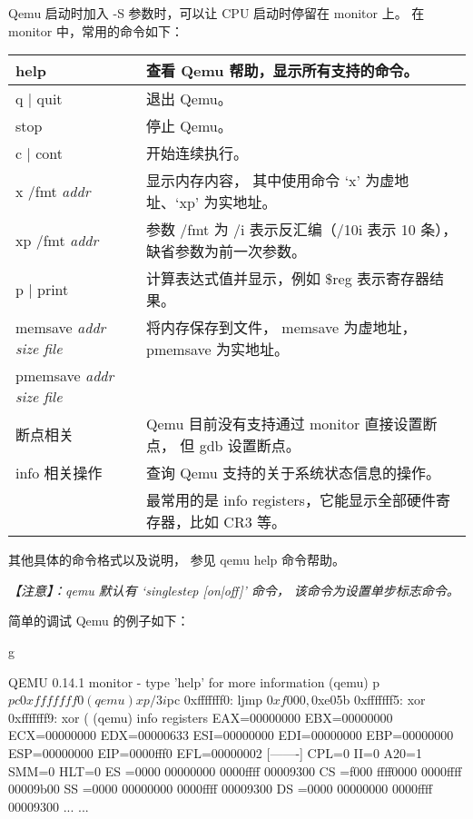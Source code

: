 Qemu 启动时加入 -S 参数时，可以让 CPU 启动时停留在 monitor 上。
在 monitor 中，常用的命令如下：
\begin{small}
\begin{longtable}[htbp]
{|>{\raggedright}p{}@{\hspace{1em}}|>{\raggedright}p{}|}
\hline
help & 查看 Qemu 帮助，显示所有支持的命令。\tabularnewline\hline
q | quit & 退出 Qemu。\tabularnewline\hline
stop & 停止 Qemu。\tabularnewline\hline
c | cont & 开始连续执行。\tabularnewline\hline
x /fmt {\it{addr}} & 显示内存内容，
    其中使用命令 `x' 为虚地址、`xp' 为实地址。\tabularnewline
xp /fmt {\it{addr}} & 参数 /fmt 为 /i 表示反汇编（/10i 表示 10 条），
    缺省参数为前一次参数。\tabularnewline\hline
p | print & 计算表达式值并显示，例如 \$reg 表示寄存器结果。\tabularnewline\hline
memsave {\it{addr size file}} & 将内存保存到文件，
    memsave 为虚地址，pmemsave 为实地址。\tabularnewline
pmemsave {\it{addr size file}} & \tabularnewline\hline
断点相关 & Qemu 目前没有支持通过 monitor 直接设置断点，
    但 gdb 设置断点。\tabularnewline\hline
info 相关操作 & 查询 Qemu 支持的关于系统状态信息的操作。\tabularnewline
& 最常用的是 info registers，它能显示全部硬件寄存器，比如 CR3 等。\tabularnewline\hline
\end{longtable}
\end{small}

\noindent
其他具体的命令格式以及说明，
参见 qemu help 命令帮助。

\emph{【注意】：qemu 默认有 `singlestep [on|off]' 命令，
该命令为设置单步标志命令。}

\clearpage

简单的调试 Qemu 的例子如下：

\begin{minipage}{0.95\textwidth}
\centering
\begin{small}
g\begin{bashcode2}
QEMU 0.14.1 monitor - type 'help' for more information
(qemu) p $pc
    0xfffffff0
(qemu) xp /3i $pc
    0xfffffff0:  ljmp   $0xf000,$0xe05b
    0xfffffff5:  xor    %
    0xfffffff9:  xor    (%
(qemu) info registers
    EAX=00000000 EBX=00000000 ECX=00000000 EDX=00000633
    ESI=00000000 EDI=00000000 EBP=00000000 ESP=00000000
    EIP=0000fff0 EFL=00000002 [-------] CPL=0 II=0 A20=1 SMM=0 HLT=0
    ES =0000 00000000 0000ffff 00009300
    CS =f000 ffff0000 0000ffff 00009b00
    SS =0000 00000000 0000ffff 00009300
    DS =0000 00000000 0000ffff 00009300
    ... ...
\end{bashcode2}
\end{small}
\end{minipage}

